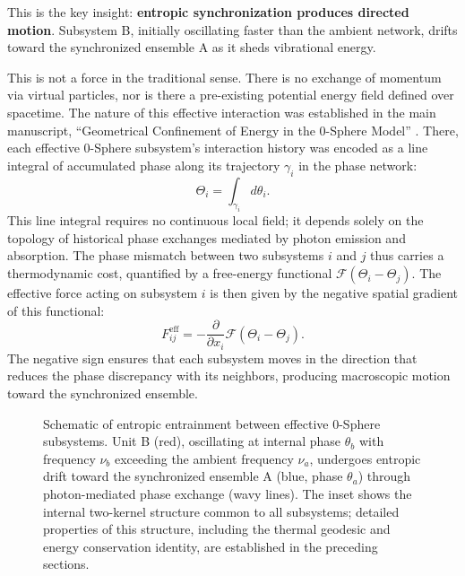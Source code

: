 \documentclass[12pt,letterpaper]{article}
\begin{document}
This is the key insight: \textbf{entropic synchronization produces directed motion}. Subsystem B, initially oscillating faster than the ambient network, drifts toward the synchronized ensemble A as it sheds vibrational energy.

This is not a force in the traditional sense. There is no exchange of momentum via virtual particles, nor is there a pre-existing potential energy field defined over spacetime. The nature of this effective interaction was established in the main manuscript, ``Geometrical Confinement of Energy in the 0-Sphere Model'' \cite{Hanamura2026geometrical}. There, each effective 0-Sphere subsystem's interaction history was encoded as a line integral of accumulated phase along its trajectory $\gamma_i$ in the phase network:
\[
  \Theta_i = \int_{\gamma_i} d\theta_i.
\]
This line integral requires no continuous local field; it depends solely on the topology of historical phase exchanges mediated by photon emission and absorption. The phase mismatch between two subsystems $i$ and $j$ thus carries a thermodynamic cost, quantified by a free-energy functional $\mathcal{F}(\Theta_i - \Theta_j)$. The effective force acting on subsystem $i$ is then given by the negative spatial gradient of this functional:
\begin{equation}
  F^{\mathrm{eff}}_{ij} = -\frac{\partial}{\partial x_i}\mathcal{F}\!\left(\Theta_i - \Theta_j\right).
\end{equation}
The negative sign ensures that each subsystem moves in the direction that reduces the phase discrepancy with its neighbors, producing macroscopic motion toward the synchronized ensemble.


\begin{figure}[t!]
\centering

\caption{\justifying Schematic of entropic entrainment between effective 0-Sphere subsystems. Unit B (red), oscillating at internal phase $\theta_b$ with frequency $\nu_b$ exceeding the ambient frequency $\nu_a$, undergoes entropic drift toward the synchronized ensemble A (blue, phase $\theta_a$) through photon-mediated phase exchange (wavy lines). The inset shows the internal two-kernel structure common to all subsystems; detailed properties of this structure, including the thermal geodesic and energy conservation identity, are established in the preceding sections.}
\label{fig:entrainment}
\end{figure}
\end{document}
